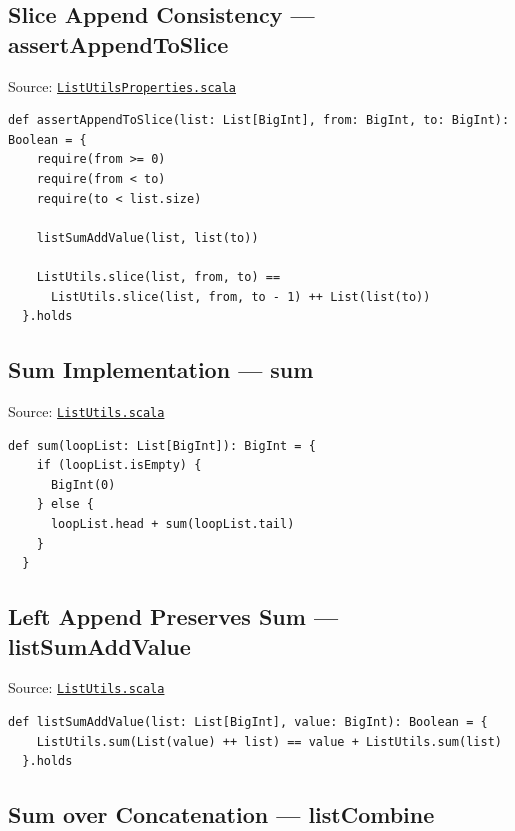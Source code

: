 \subsection{Slice Append Consistency --- assertAppendToSlice}

Source:
\href{https://github.com/thiagomata/prime-numbers/blob/list-article-v1.0.0/src/main/scala/v1/chapter3/list/properties/ListUtilsProperties.scala}{\texttt{ListUtilsProperties.scala}}

\begin{lstlisting}[style=scala]
  def assertAppendToSlice(list: List[BigInt], from: BigInt, to: BigInt): Boolean = {
    require(from >= 0)
    require(from < to)
    require(to < list.size)

    listSumAddValue(list, list(to))

    ListUtils.slice(list, from, to) ==
      ListUtils.slice(list, from, to - 1) ++ List(list(to))
  }.holds
\end{lstlisting}

\subsection{Sum Implementation --- sum}

Source:
\href{https://github.com/thiagomata/prime-numbers/blob/list-article-v1.0.0/src/main/scala/v1/chapter3/list/ListUtils.scala}{\texttt{ListUtils.scala}}

\begin{lstlisting}[style=scala]
  def sum(loopList: List[BigInt]): BigInt = {
    if (loopList.isEmpty) {
      BigInt(0)
    } else {
      loopList.head + sum(loopList.tail)
    }
  }
\end{lstlisting}

\subsection{Left Append Preserves Sum --- listSumAddValue}

Source:
\href{https://github.com/thiagomata/prime-numbers/blob/list-article-v1.0.0/src/main/scala/v1/chapter3/list/ListUtils.scala}{\texttt{ListUtils.scala}}

\begin{lstlisting}[style=scala]
def listSumAddValue(list: List[BigInt], value: BigInt): Boolean = {
    ListUtils.sum(List(value) ++ list) == value + ListUtils.sum(list)
  }.holds
\end{lstlisting}

\subsection{Sum over Concatenation --- listCombine}

